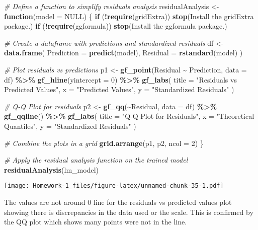 \documentclass[
]{article}
\newenvironment{Shaded}{\begin{snugshade}}{\end{snugshade}}
\newcommand{\AttributeTok}[1]{\textcolor[rgb]{0.13,0.29,0.53}{#1}}
\newcommand{\CommentTok}[1]{\textcolor[rgb]{0.56,0.35,0.01}{\textit{#1}}}
\newcommand{\ConstantTok}[1]{\textcolor[rgb]{0.56,0.35,0.01}{#1}}
\newcommand{\ControlFlowTok}[1]{\textcolor[rgb]{0.13,0.29,0.53}{\textbf{#1}}}
\newcommand{\DecValTok}[1]{\textcolor[rgb]{0.00,0.00,0.81}{#1}}
\newcommand{\FunctionTok}[1]{\textcolor[rgb]{0.13,0.29,0.53}{\textbf{#1}}}
\newcommand{\NormalTok}[1]{#1}
\newcommand{\OtherTok}[1]{\textcolor[rgb]{0.56,0.35,0.01}{#1}}
\newcommand{\SpecialCharTok}[1]{\textcolor[rgb]{0.81,0.36,0.00}{\textbf{#1}}}
\newcommand{\StringTok}[1]{\textcolor[rgb]{0.31,0.60,0.02}{#1}}
\begin{document}
\begin{Shaded}
\begin{Highlighting}[]
\CommentTok{\# Define a function to simplify residuals analysis}
\NormalTok{residualAnalysis }\OtherTok{\textless{}{-}} \ControlFlowTok{function}\NormalTok{(}\AttributeTok{model =} \ConstantTok{NULL}\NormalTok{) \{}
  \ControlFlowTok{if}\NormalTok{ (}\SpecialCharTok{!}\FunctionTok{require}\NormalTok{(gridExtra)) }\FunctionTok{stop}\NormalTok{(}\StringTok{\textquotesingle{}Install the gridExtra package.\textquotesingle{}}\NormalTok{)}
  \ControlFlowTok{if}\NormalTok{ (}\SpecialCharTok{!}\FunctionTok{require}\NormalTok{(ggformula)) }\FunctionTok{stop}\NormalTok{(}\StringTok{\textquotesingle{}Install the ggformula package.\textquotesingle{}}\NormalTok{)}
  
  \CommentTok{\# Create a dataframe with predictions and standardized residuals}
\NormalTok{  df }\OtherTok{\textless{}{-}} \FunctionTok{data.frame}\NormalTok{(}
    \AttributeTok{Prediction =} \FunctionTok{predict}\NormalTok{(model),}
    \AttributeTok{Residual =} \FunctionTok{rstandard}\NormalTok{(model)}
\NormalTok{  )}
  
  \CommentTok{\# Plot residuals vs predictions}
\NormalTok{  p1 }\OtherTok{\textless{}{-}} \FunctionTok{gf\_point}\NormalTok{(Residual }\SpecialCharTok{\textasciitilde{}}\NormalTok{ Prediction, }\AttributeTok{data =}\NormalTok{ df) }\SpecialCharTok{\%\textgreater{}\%} 
    \FunctionTok{gf\_hline}\NormalTok{(}\AttributeTok{yintercept =} \DecValTok{0}\NormalTok{) }\SpecialCharTok{\%\textgreater{}\%} 
    \FunctionTok{gf\_labs}\NormalTok{(}
      \AttributeTok{title =} \StringTok{"Residuals vs Predicted Values"}\NormalTok{,}
      \AttributeTok{x =} \StringTok{"Predicted Values"}\NormalTok{,}
      \AttributeTok{y =} \StringTok{"Standardized Residuals"}
\NormalTok{    )}
  
  \CommentTok{\# Q{-}Q Plot for residuals}
\NormalTok{  p2 }\OtherTok{\textless{}{-}} \FunctionTok{gf\_qq}\NormalTok{(}\SpecialCharTok{\textasciitilde{}}\NormalTok{Residual, }\AttributeTok{data =}\NormalTok{ df) }\SpecialCharTok{\%\textgreater{}\%} 
    \FunctionTok{gf\_qqline}\NormalTok{() }\SpecialCharTok{\%\textgreater{}\%} 
    \FunctionTok{gf\_labs}\NormalTok{(}
      \AttributeTok{title =} \StringTok{"Q{-}Q Plot for Residuals"}\NormalTok{,}
      \AttributeTok{x =} \StringTok{"Theoretical Quantiles"}\NormalTok{,}
      \AttributeTok{y =} \StringTok{"Standardized Residuals"}
\NormalTok{    )}
  
  \CommentTok{\# Combine the plots in a grid}
  \FunctionTok{grid.arrange}\NormalTok{(p1, p2, }\AttributeTok{ncol =} \DecValTok{2}\NormalTok{)}
\NormalTok{\}}

\CommentTok{\# Apply the residual analysis function on the trained model}
\FunctionTok{residualAnalysis}\NormalTok{(lm\_model)}
\end{Highlighting}
\end{Shaded}

\texttt{[image: Homework-1\_files/figure-latex/unnamed-chunk-35-1.pdf]}

The values are not around 0 line for the residuals vs predicted values
plot showing there is discrepancies in the data used or the scale. This
is confirmed by the QQ plot which shows many points were not in the
line.
\end{document}
